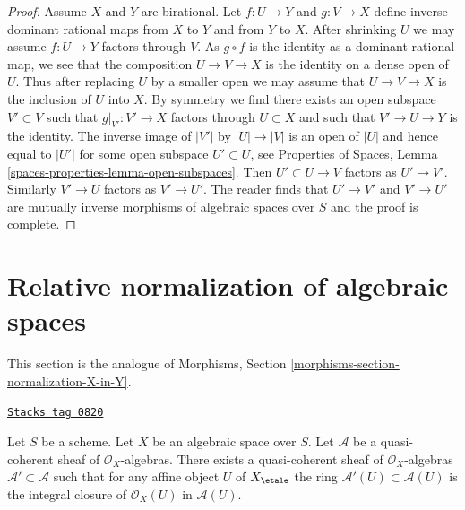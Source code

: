 \begin{proof}
Assume $X$ and $Y$ are birational. Let $f : U \to Y$ and $g : V \to X$
define inverse dominant rational maps from $X$ to $Y$ and from $Y$ to $X$.
After shrinking $U$ we may assume $f : U \to Y$ factors through $V$.
As $g \circ f$ is the identity as a dominant rational map, we see that
the composition $U \to V \to X$ is the identity on a dense open of $U$.
Thus after replacing $U$ by a smaller open we may assume that
$U \to V \to X$ is the inclusion of $U$ into $X$.
By symmetry we find there exists an open subspace $V' \subset V$
such that $g|_{V'} : V' \to X$ factors through $U \subset X$
and such that $V' \to U \to Y$ is the identity.
The inverse image of $|V'|$ by $|U| \to |V|$ is an open of $|U|$
and hence equal to $|U'|$ for some open subspace $U' \subset U$, see
Properties of Spaces, Lemma \ref{spaces-properties-lemma-open-subspaces}.
Then $U' \subset U \to V$ factors as $U' \to V'$.
Similarly $V' \to U$ factors as $V' \to U'$.
The reader finds that $U' \to V'$
and $V' \to U'$ are mutually inverse
morphisms of algebraic spaces over $S$
and the proof is complete.
\end{proof}

\section{Relative normalization of algebraic spaces}
\label{spaces-morphisms-section-normalization-X-in-Y}
This section is the analogue of
Morphisms, Section \ref{morphisms-section-normalization-X-in-Y}.

\begin{lemma}
\label{spaces-morphisms-lemma-integral-closure}
\href{https://stacks.math.columbia.edu/tag/0820}{\texttt{Stacks tag 0820}}

Let $S$ be a scheme. Let $X$ be an algebraic space over $S$.
Let $\mathcal{A}$ be a quasi-coherent sheaf of $\mathcal{O}_X$-algebras.
There exists a quasi-coherent sheaf of $\mathcal{O}_X$-algebras
$\mathcal{A}' \subset \mathcal{A}$ such that
for any affine object $U$ of $X_\etale$ the ring
$\mathcal{A}'(U) \subset \mathcal{A}(U)$ is
the integral closure of $\mathcal{O}_X(U)$ in $\mathcal{A}(U)$.
\end{lemma}

